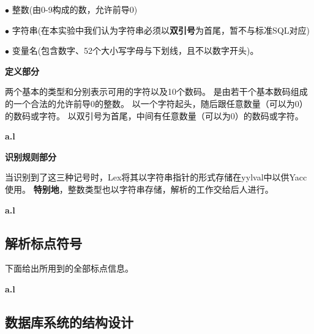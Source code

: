 \documentclass{article}
\begin{document}
\begin{spacing}{2}
                \indent \indent $\bullet$ 整数(由0-9构成的数，允许前导0)

                \indent \indent $\bullet$ 字符串(在本实验中我们认为字符串必须以\textbf{双引号}为首尾，暂不与标准SQL对应)
                
                \indent \indent $\bullet$ 变量名(包含数字、52个大小写字母与下划线，且不以数字开头)。

            \textbf{定义部分}

            两个基本的类型和分别表示可用的字符以及10个数码。
            是由若干个基本数码组成的一个合法的允许前导0的整数。
            以一个字符起头，随后跟任意数量（可以为0）的数码或字符。
            以双引号为首尾，中间有任意数量（可以为0）的数码或字符。

            \textbf{a.l}
            \begin{spacing}{1.15}
            
            \end{spacing}

            \textbf{识别规则部分}   

                当识别到了这三种记号时，Lex将其以字符串指针的形式存储在yylval中以供Yacc使用。
                \textbf{特别地}，整数类型也以字符串存储，解析的工作交给后人进行。

            \textbf{a.l}
            \begin{spacing}{1.15}
            
            \end{spacing}

        \subsection{解析标点符号}
            下面给出所用到的全部标点信息。

            \textbf{a.l}
            \begin{spacing}{1.15}
            
            \end{spacing}



    \subsection{数据库系统的结构设计}

\end{spacing}
\end{document}
